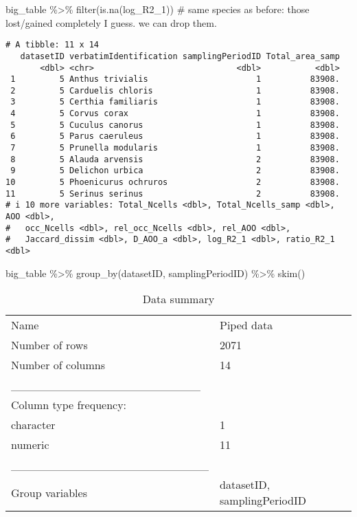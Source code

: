 \documentclass[
  letterpaper,
  DIV=11,
  numbers=noendperiod]{scrreprt}
\newenvironment{Shaded}{\begin{snugshade}}{\end{snugshade}}
\newcommand{\CommentTok}[1]{\textcolor[rgb]{0.37,0.37,0.37}{#1}}
\newcommand{\FunctionTok}[1]{\textcolor[rgb]{0.28,0.35,0.67}{#1}}
\newcommand{\NormalTok}[1]{\textcolor[rgb]{0.00,0.23,0.31}{#1}}
\newcommand{\SpecialCharTok}[1]{\textcolor[rgb]{0.37,0.37,0.37}{#1}}
\begin{document}
\begin{Shaded}
\begin{Highlighting}[]
\NormalTok{big\_table }\SpecialCharTok{\%\textgreater{}\%} \FunctionTok{filter}\NormalTok{(}\FunctionTok{is.na}\NormalTok{(log\_R2\_1)) }\CommentTok{\# same species as before: those lost/gained completely I guess. we can drop them.}
\end{Highlighting}
\end{Shaded}

\begin{verbatim}
# A tibble: 11 x 14
   datasetID verbatimIdentification samplingPeriodID Total_area_samp
       <dbl> <chr>                             <dbl>           <dbl>
 1         5 Anthus trivialis                      1          83908.
 2         5 Carduelis chloris                     1          83908.
 3         5 Certhia familiaris                    1          83908.
 4         5 Corvus corax                          1          83908.
 5         5 Cuculus canorus                       1          83908.
 6         5 Parus caeruleus                       1          83908.
 7         5 Prunella modularis                    1          83908.
 8         5 Alauda arvensis                       2          83908.
 9         5 Delichon urbica                       2          83908.
10         5 Phoenicurus ochruros                  2          83908.
11         5 Serinus serinus                       2          83908.
# i 10 more variables: Total_Ncells <dbl>, Total_Ncells_samp <dbl>, AOO <dbl>,
#   occ_Ncells <dbl>, rel_occ_Ncells <dbl>, rel_AOO <dbl>,
#   Jaccard_dissim <dbl>, D_AOO_a <dbl>, log_R2_1 <dbl>, ratio_R2_1 <dbl>
\end{verbatim}

\begin{Shaded}
\begin{Highlighting}[]
\NormalTok{big\_table }\SpecialCharTok{\%\textgreater{}\%} \FunctionTok{group\_by}\NormalTok{(datasetID, samplingPeriodID) }\SpecialCharTok{\%\textgreater{}\%} \FunctionTok{skim}\NormalTok{()}
\end{Highlighting}
\end{Shaded}

\begin{longtable}[]{@{}ll@{}}
\caption{Data summary}\tabularnewline
\toprule\noalign{}
\endfirsthead
\endhead
\bottomrule\noalign{}
\endlastfoot
Name & Piped data \\
Number of rows & 2071 \\
Number of columns & 14 \\
\_\_\_\_\_\_\_\_\_\_\_\_\_\_\_\_\_\_\_\_\_\_\_ & \\
Column type frequency: & \\
character & 1 \\
numeric & 11 \\
\_\_\_\_\_\_\_\_\_\_\_\_\_\_\_\_\_\_\_\_\_\_\_\_ & \\
Group variables & datasetID, samplingPeriodID \\
\end{longtable}
\end{document}
